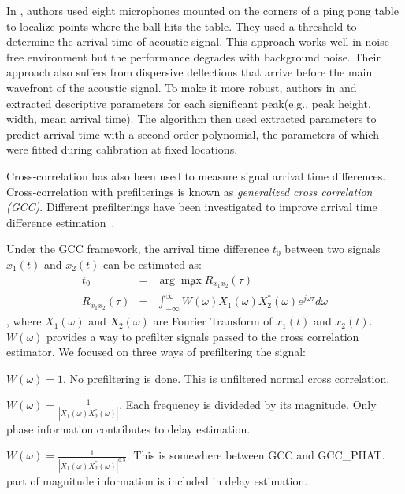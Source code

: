 In \cite{tdoa:ppp}, authors used eight microphones mounted on the corners of a ping pong table to localize points where the ball hits the table. They used a threshold to determine the arrival time of acoustic signal. This approach works well in noise free environment but the performance degrades with background noise. Their approach also suffers from dispersive deflections that arrive before the main wavefront of the acoustic signal. To make it more robust, authors in \cite{tdoa:mit3} and \cite{tdoa:mit4} extracted descriptive parameters for each significant peak(e.g., peak height, width, mean arrival time). The algorithm then used extracted parameters to predict arrival time with a second order polynomial, the parameters of which were fitted during calibration at fixed locations.

Cross-correlation has also been used to measure signal arrival time differences\cite{tdoa:mit2, tdoa:micloc, tdoa:3}. Cross-correlation with prefilterings is known as \emph{generalized cross correlation (GCC)}. Different prefilterings have been investigated to improve arrival time difference estimation~\cite{tdoa:gcc1,tdoa:gcc2,tdoa:gcc3}.

Under the GCC framework, the arrival time difference $t_0$ between two signals $x_1(t)$ and $x_2(t)$ can be estimated as:
\begin{eqnarray} \label{eq:gcc}
t_0 &=& \arg\max_{\tau} R_{x_1x_2}(\tau) \\\label{eq:gcc2}
R_{x_1x_2}(\tau) &=& \int_{-\infty}^\infty W(\omega) X_1(\omega) X_2^{*}(\omega) e^{j\omega\tau} d\omega
\end{eqnarray}
, where $X_1(\omega)$ and $X_2(\omega)$ are Fourier Transform of $x_1(t)$ and $x_2(t)$. $W(\omega)$ provides a way to prefilter signals passed to the cross correlation estimator. We focused on three ways of prefiltering the signal:
\begin{description}
\item[GCC] $W(\omega) = 1$. No prefiltering is done. This is unfiltered normal cross correlation.
\item[GCC\_PHAT] $W(\omega) = \frac{1}{\left|X_1(\omega)X_2^{*}(\omega)\right|}$. Each frequency is divideded by its magnitude. Only phase information contributes to delay estimation.
\item[GCC\_PHAT\_SQRT] $W(\omega) = \frac{1}{\left|X_1(\omega)X_2^*(\omega)\right|^{0.5}}$. This is somewhere between GCC and GCC\_PHAT. part of magnitude information is included in delay estimation.
\end{description}
